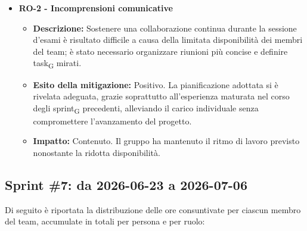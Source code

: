 ﻿\documentclass[a4paper, 10pt, colorlinks=true, linkcolor=black, urlcolor=blue, citecolor=blue, hidelinks]{article}
\begin{document}
\begin{itemize}
\begin{itemize}
\begin{itemize}
            \item \textbf{Impatto:} Contenuto. Lo slittamento ha riguardato pochi giorni e non ha inciso sulla qualità della documentazione né sugli obiettivi complessivi della RTB\textsubscript{G}.
        \end{itemize}
        \item \textbf{RO-2 - Incomprensioni comunicative}
        \begin{itemize}
            \item \textbf{Descrizione:} Sostenere una collaborazione continua durante la sessione d'esami è risultato difficile a causa della limitata disponibilità dei membri del team; è stato necessario organizzare riunioni più concise e definire task\textsubscript{G} mirati.
            \item \textbf{Esito della mitigazione:} Positivo. La pianificazione adottata si è rivelata adeguata, grazie soprattutto all'esperienza maturata nel corso degli sprint\textsubscript{G} precedenti, alleviando il carico individuale senza compromettere l'avanzamento del progetto.
            \item \textbf{Impatto:} Contenuto. Il gruppo ha mantenuto il ritmo di lavoro previsto nonostante la ridotta disponibilità.
        \end{itemize}
    \end{itemize}
\end{itemize}

\subsection{Sprint \#7: da 2026-06-23 a 2026-07-06}
Di seguito è riportata la distribuzione delle ore consuntivate per ciascun membro del team, accumulate in totali per persona e per ruolo:
\end{document}
